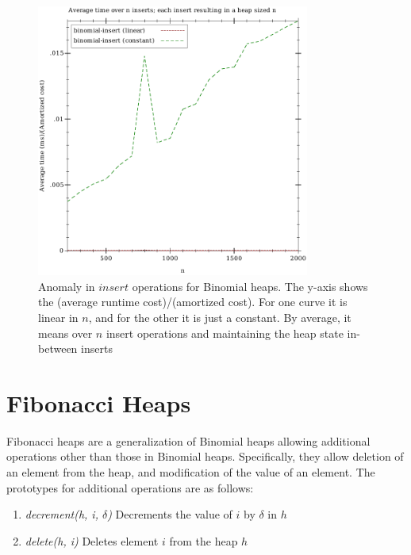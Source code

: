 \documentclass{llncs}
\begin{document}
\begin{figure}
\begin{center}
	\includegraphics[width=0.8\textwidth]{FIG/insert_binomial.pdf}
\end{center}
\caption{Anomaly in $insert$ operations for Binomial heaps. The y-axis shows the (average runtime cost)/(amortized cost). For one curve it is linear in $n$, and for the other it is just a constant. By average, it means over $n$ insert operations and maintaining the heap state in-between inserts}
\label{fig:bino_anomaly}
\end{figure}

\section{Fibonacci Heaps}
Fibonacci heaps are a generalization of Binomial heaps allowing additional operations other than those in Binomial heaps. Specifically, they allow deletion of an element from the heap, and modification of the value of an element. The prototypes for additional operations are as follows: \\

\begin{enumerate}
	\item \emph{decrement(h, i, $\delta$)} Decrements the value of $i$ by $\delta$ in $h$
	\item \emph{delete(h, i)} Deletes element $i$ from the heap $h$ 
\end{enumerate}
\end{document}
